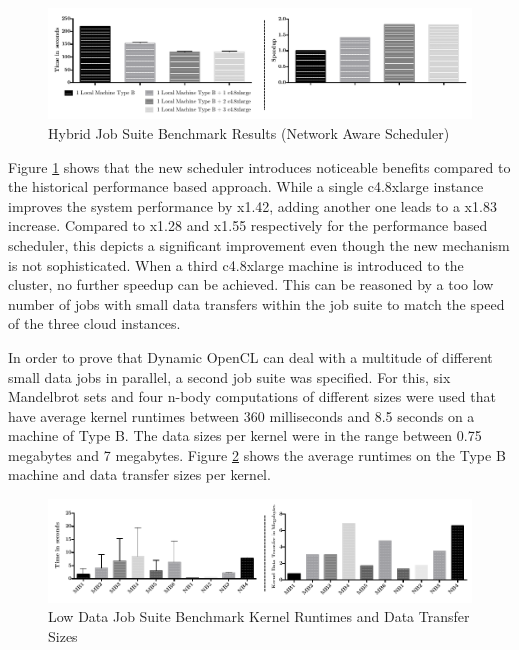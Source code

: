 \begin{figure}[!htb]
	\includegraphics[width=1.0\textwidth]{images/hybrid_full_benchmark_network_based.pdf}
	\centering
	\caption{Hybrid Job Suite  Benchmark Results (Network Aware Scheduler)}
	\label{img:hybrid_benchmark_results_network_aware}
\end{figure}

Figure \ref{img:hybrid_benchmark_results_network_aware} shows that the new scheduler introduces noticeable benefits compared to the historical performance based approach. While a single c4.8xlarge instance improves the system performance by x1.42, adding another one leads to a x1.83 increase. Compared to x1.28 and x1.55 respectively for the performance based scheduler, this depicts a significant improvement even though the new mechanism is not sophisticated. When a third c4.8xlarge machine is introduced to the cluster, no further speedup can be achieved. This can be reasoned by a too low number of jobs with small data transfers within the job suite to match the speed of the three cloud instances.

In order to prove that Dynamic OpenCL can deal with a multitude of different small data jobs in parallel, a second job suite was specified. For this, six Mandelbrot sets and four n-body computations of different sizes were used that have average kernel runtimes between 360 milliseconds and 8.5 seconds on a machine of Type B. The data sizes per kernel were in the range between 0.75 megabytes and 7 megabytes. Figure \ref{img:low_data_benchmark_statistics} shows the average runtimes on the Type B machine and data transfer sizes per kernel.

\begin{figure}[!htb]
	\includegraphics[width=1.0\textwidth]{images/lowdata_benchmark_statistics.pdf}
	\centering
	\caption{Low Data Job Suite Benchmark Kernel Runtimes and Data Transfer Sizes}
	\label{img:low_data_benchmark_statistics}
\end{figure}

